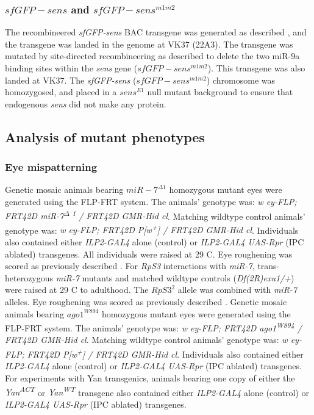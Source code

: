 \subsubsection{$sfGFP-sens$ and $sfGFP-sens^{m1m2}$}
\label{appendix:supp:metabolism:exp:sfgfp_sens}

The recombineered \textit{sfGFP-sens} BAC transgene was generated as described \cite{Cassidy2013}, and the transgene was landed in the genome at VK37 (22A3). The transgene was mutated by site-directed recombineering as described \cite{Cassidy2013} to delete the two miR-9a binding sites within the \textit{sens} gene ($sfGFP-sens^{m1m2}$). This transgene was also landed at VK37. The \textit{sfGFP-sens} ($sfGFP-sens^{m1m2}$) chromosome was homozygosed, and placed in a $sens^{E1}$ null mutant background to ensure that endogenous \textit{sens} did not make any protein.

\subsection{Analysis of mutant phenotypes}
\label{appendix:supp:metabolism:exp:phenotypes}

\subsubsection{Eye mispatterning}

Genetic mosaic animals bearing $miR-7^{\Delta 1}$ homozygous mutant eyes were generated using the FLP-FRT system. The animals' genotype was: \textit{w ey-FLP; FRT42D miR-7\textsuperscript{$\Delta$ 1} / FRT42D GMR-Hid cl}. Matching wildtype control animals' genotype was: \textit{w ey-FLP; FRT42D P{[}w\textsuperscript{+}{]} / FRT42D GMR-Hid cl}. Individuals also contained either \textit{ILP2-GAL4} alone (control) or \textit{ILP2-GAL4 UAS-Rpr} (IPC ablated) transgenes. All individuals were raised at 29 \textdegree{}C. Eye roughening was scored as previously described \cite{Li2009}. For \textit{RpS3} interactions with \textit{miR-7}, trans-heterozygous \textit{miR-7} mutants and matched wildtype controls (\textit{Df(2R)exu1/+}) were raised at 29 \textdegree{}C to adulthood. The $RpS3^2$ allele was combined with \textit{miR-7} alleles. Eye roughening was scored as previously described \cite{Li2009}. Genetic mosaic animals bearing $ago1^{W894}$ homozygous mutant eyes were generated using the FLP-FRT system. The animals' genotype was: \textit{w ey-FLP; FRT42D ago1\textsuperscript{W894} / FRT42D GMR-Hid cl}. Matching wildtype control animals' genotype was: \textit{w ey-FLP; FRT42D P{[}w\textsuperscript{+}{]} / FRT42D GMR-Hid cl}. Individuals also contained either \textit{ILP2-GAL4} alone (control) or \textit{ILP2-GAL4 UAS-Rpr} (IPC ablated) transgenes. For experiments with Yan transgenics, animals bearing one copy of either the \textit{Yan\textsuperscript{ACT}} or \textit{Yan\textsuperscript{WT}} \cite{Rebay1995} transgene also contained either \textit{ILP2-GAL4} alone (control) or \textit{ILP2-GAL4 UAS-Rpr} (IPC ablated) transgenes.

